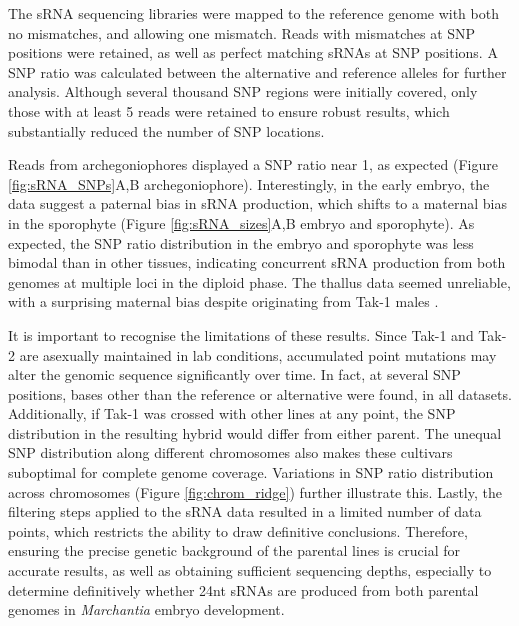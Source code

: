 The sRNA sequencing libraries were mapped to the reference genome with both no mismatches, and allowing one mismatch. Reads with mismatches at SNP positions were retained, as well as perfect matching sRNAs at SNP positions. A SNP ratio was calculated between the alternative and reference alleles for further analysis. Although several thousand SNP regions were initially covered, only those with at least 5 reads were retained to ensure robust results, which substantially reduced the number of SNP locations. 

Reads from archegoniophores displayed a SNP ratio near 1, as expected (Figure \ref{fig:sRNA_SNPs}A,B archegoniophore). Interestingly, in the early embryo, the data suggest a paternal bias in sRNA production, which shifts to a maternal bias in the sporophyte (Figure \ref{fig:sRNA_sizes}A,B embryo and sporophyte). As expected, the SNP ratio distribution in the embryo and sporophyte was less bimodal than in other tissues, indicating concurrent sRNA production from both genomes at multiple loci in the diploid phase. The thallus data seemed unreliable, with a surprising maternal bias despite originating from Tak-1 males \citep{RN265}.

It is important to recognise the limitations of these results. Since Tak-1 and Tak-2 are asexually maintained in lab conditions, accumulated point mutations may alter the genomic sequence significantly over time. In fact, at several SNP positions, bases other than the reference or alternative were found, in all datasets. Additionally, if Tak-1 was crossed with other lines at any point, the SNP distribution in the resulting hybrid would differ from either parent. The unequal SNP distribution along different chromosomes also makes these cultivars suboptimal for complete genome coverage. Variations in SNP ratio distribution across chromosomes (Figure \ref{fig:chrom_ridge}) further illustrate this. Lastly, the filtering steps applied to the sRNA data resulted in a limited number of data points, which restricts the ability to draw definitive conclusions. Therefore, ensuring the precise genetic background of the parental lines is crucial for accurate results, as well as obtaining sufficient sequencing depths, especially to determine definitively whether 24nt sRNAs are produced from both parental genomes in \textit{Marchantia} embryo development.

